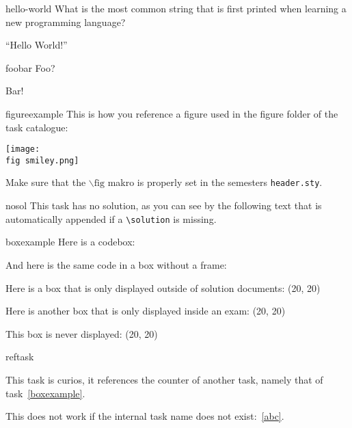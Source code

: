 
\begin{task}{hello-world}
What is the most common string that is first printed when learning a new programming language?
    
\solution

``Hello World!''
\end{task}



\begin{task}{foobar}
Foo?
    
\solution

Bar!
\end{task}



\begin{task}{figureexample}
This is how you reference a figure used in the figure folder of the task catalogue:

\centerline{\texttt{[image: \\fig smiley.png]}}

Make sure that the $\backslash \text{fig}$ makro is properly set in the semesters \verb!header.sty!.
\end{task}



\begin{task}{nosol}
This task has no solution, as you can see by the following text that is automatically
appended if a \verb!\solution! is missing.
\end{task}



\begin{task}{boxexample}
Here is a codebox:

\lstset{language=Python}

And here is the same code in a box without a frame:


Here is a box that is only displayed outside of solution documents: \Box(20, 20)

Here is another box that is only displayed inside an exam: \KBox(20, 20)

\solution

This box is never displayed: \Box(20, 20)

\end{task}



\begin{task}{reftask}

This task is curios, it references the counter of another task, namely that of
task~\ref{boxexample}.

\solution

This does not work if the internal task name does not exist:~\ref{abc}.

\end{task}